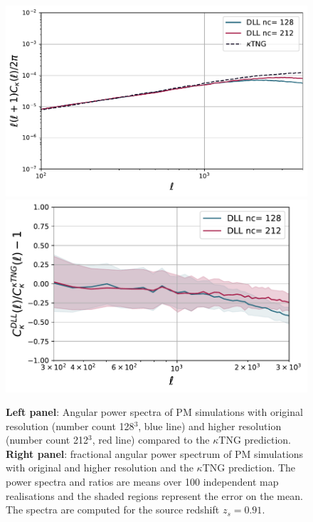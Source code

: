 \documentclass[twocolumn,twocolappendix]{aastex63}
\begin{document}
{\renewcommand{\thefigure}{C\arabic{figure}}
\setcounter{figure}{0}
\begin{figure}
    \centering
    \includegraphics[width=\columnwidth]{paper/figures/cls_DLL_vs_ktng_high.pdf}
        \includegraphics[width=\columnwidth]{paper/figures/res_cls_DLL_vs_ktng_high.pdf}
    \caption{
    \textbf{Left panel}: Angular power spectra of PM simulations with original resolution (number count 128$^3$, blue line) and higher resolution (number count 212$^3$, red line) compared to the $\kappa$TNG prediction. \textbf{Right panel}: fractional angular power spectrum of PM simulations with original and higher resolution and the $\kappa$TNG prediction. The power spectra and ratios are means over 100 independent map realisations and the shaded regions represent the error on the mean. The spectra are computed for the source redshift $z_s=0.91$. 
}
    \label{fig:ps_comp_high}
\end{figure}

}
\end{document}
